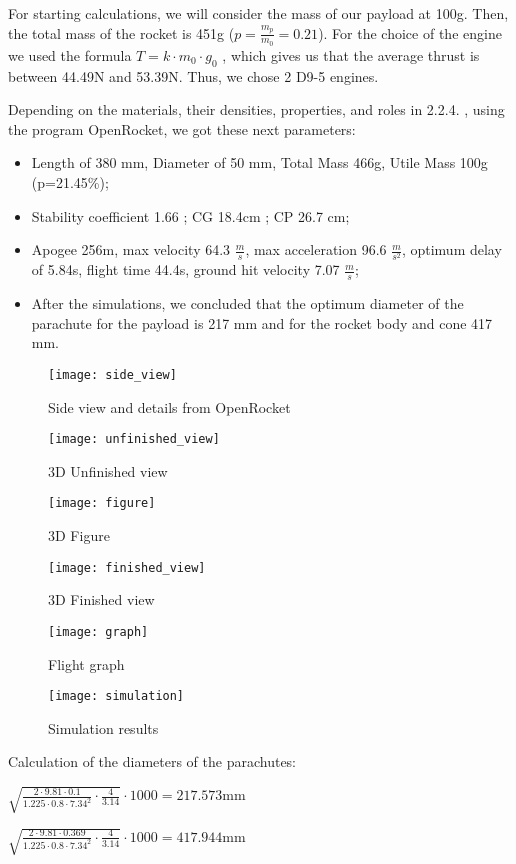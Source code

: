 For starting calculations, we will consider the mass of our payload at 100g. Then, the total mass of the rocket is 451g ($ p = \frac{m_p}{m_0} = 0.21 $). For the choice of the engine we used the formula $ T = k \cdot m_0 \cdot g_0 $ , which gives us that the average thrust is between 44.49N and 53.39N. Thus, we chose 2 D9-5 engines.

Depending on the materials, their densities, properties, and roles in 2.2.4. , using the program OpenRocket, we got these next parameters:
\begin{itemize}
    \item Length of 380 mm, Diameter of 50 mm, Total Mass 466g, Utile Mass 100g (p=21.45\%); 
    \item Stability coefficient 1.66 ; CG 18.4cm ; CP 26.7 cm; 
    \item Apogee 256m, max velocity 64.3 $ \frac{m}{s} $, max acceleration 96.6 $ \frac{m}{s^2} $, optimum delay of 5.84s, flight time 44.4s, ground hit velocity 7.07 $ \frac{m}{s} $;
    \item After the simulations, we concluded that the optimum diameter of the parachute for the payload is 217 mm and for the rocket body and cone 417 mm.
\end{itemize}

\begin{multicols}{2}

\begin{figure}[H]
\centering
\texttt{[image: side\_view]}
\caption{Side view and details from OpenRocket}
\end{figure}

\begin{figure}[H]
\centering
\texttt{[image: unfinished\_view]}
\caption{3D Unfinished view}
\end{figure}

\begin{figure}[H]
\centering
\texttt{[image: figure]}
\caption{3D Figure}
\end{figure}

\begin{figure}[H]
\centering
\texttt{[image: finished\_view]}
\caption{3D Finished view}
\end{figure}

\end{multicols}

\begin{figure}[H]
\centering
\texttt{[image: graph]}
\caption{Flight graph}
\end{figure}

\begin{figure}[H]
\centering
\texttt{[image: simulation]}
\caption{Simulation results}
\end{figure}

Calculation of the diameters of the parachutes:

$ \sqrt{\frac{2 \cdot 9.81 \cdot 0.1}{1.225 \cdot 0.8 \cdot 7.34^2} \cdot \frac{4}{3.14}} \cdot 1000 = 217.573 \mathrm{mm} $

$ \sqrt{\frac{2 \cdot 9.81 \cdot 0.369}{1.225 \cdot 0.8 \cdot 7.34^2} \cdot \frac{4}{3.14}} \cdot 1000 = 417.944 \mathrm{mm} $

